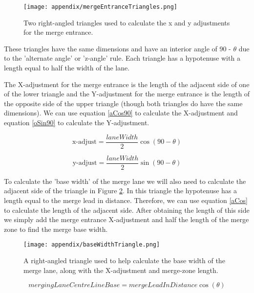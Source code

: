 \begin{appendices}
\begin{figure}[htb]
\centering
\texttt{[image: appendix/mergeEntranceTriangles.png]}
\caption{Two right-angled triangles used to calculate the x and y adjustments for the merge entrance.}
\label{fig:mergeEntranceTriangles}
\end{figure}

These triangles have the same dimensions and have an interior angle of 90 - $\theta$ due to the 'alternate angle' or 'z-angle' rule. Each triangle has a hypotenuse with a length equal to half the width of the lane. 

The X-adjustment for the merge entrance is the length of the adjacent side of one of the lower triangle and the Y-adjustment for the merge entrance is the length of the opposite side of the upper triangle (though both triangles do have the same dimensions). We can use equation \ref{aCos90} to calculate the X-adjustment and equation \ref{oSin90} to calculate the Y-adjustment.

\begin{equation}\label{aCos90}
\text{x-adjust} = \frac{laneWidth}{2} \cos(90 - \theta)
\end{equation}

\begin{equation}\label{oSin90}
\text{y-adjust} = \frac{laneWidth}{2} \sin(90 - \theta)
\end{equation}

To calculate the 'base width' of the merge lane we will also need to calculate the adjacent side of the triangle in Figure \ref{fig:baseWidthTriangle}. In this triangle the hypotenuse has a length equal to the merge lead in distance. Therefore, we can use equation \ref{aCos} to calculate the length of the adjacent side. After obtaining the length of this side we simply add the merge entrance X-adjustment and half the length of the merge zone to find the merge base width.

\begin{figure}[htb]
\centering
\texttt{[image: appendix/baseWidthTriangle.png]}
\caption{A right-angled triangle used to help calculate the base width of the merge lane, along with the X-adjustment and merge-zone length.}
\label{fig:baseWidthTriangle}
\end{figure}

\begin{equation}\label{aCos}
mergingLaneCentreLineBase = mergeLeadInDistance \cos(\theta)
\end{equation}


\end{appendices}
